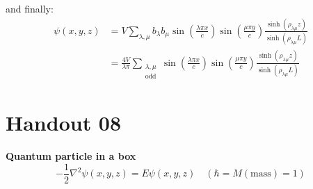 \documentclass{article}
\begin{document}
\noindent
and finally:
\begin{align}
    \psi(x, y, z)
&= V \sum_{\lambda, \mu} b_\lambda b_\mu \sin\left( \frac{\lambda \pi x}{c} \right)
\sin\left( \frac{\mu \pi y}{c} \right)
\frac{ \sinh\left( \rho_{\lambda \mu} z \right) }{ \sinh\left( \rho_{\lambda \mu} L \right) }\\
&= \frac{4V}{\lambda \pi} \sum_{\substack{\lambda, \mu \\ \text{odd}}}\sin\left( \frac{\lambda \pi x}{c} \right)
\sin\left( \frac{\mu \pi y}{c} \right)
\frac{ \sinh\left( \rho_{\lambda \mu} z \right) }
{ \sinh\left( \rho_{\lambda \mu} L \right) }
\end{align}

\section{Handout 08}

\textbf{Quantum particle in a box}
\begin{equation}
	-\frac{1}{2} \nabla^2 \psi(x, y, z) = E \psi(x, y,z) \quad (\hbar = M (\text{mass})  = 1)
\end{equation}
\end{document}
